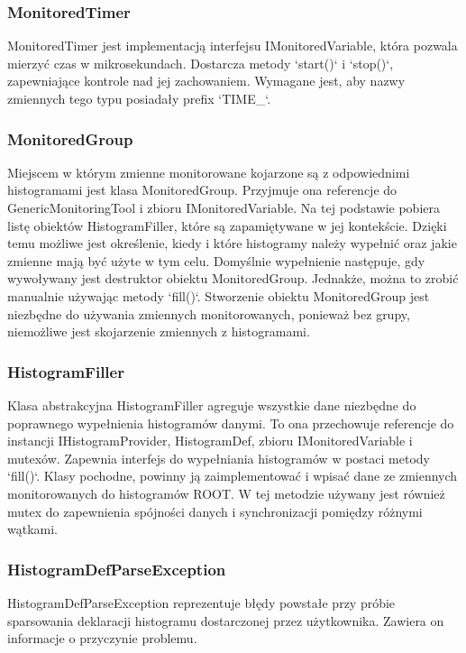 \subsubsection{MonitoredTimer}
MonitoredTimer jest implementacją interfejsu IMonitoredVariable, która pozwala mierzyć czas w mikrosekundach.
Dostarcza metody `start()` i `stop()`, zapewniające kontrole nad jej zachowaniem.
Wymagane jest, aby nazwy zmiennych tego typu posiadały prefix `TIME\_`.

\subsubsection{MonitoredGroup}
Miejscem w którym zmienne monitorowane kojarzone są z odpowiednimi histogramami jest klasa MonitoredGroup. 
Przyjmuje ona referencje do GenericMonitoringTool i zbioru IMonitoredVariable.
Na tej podstawie pobiera listę obiektów HistogramFiller, które są zapamiętywane w jej kontekście.
Dzięki temu możliwe jest określenie, kiedy i które histogramy należy wypełnić oraz jakie zmienne mają być użyte w tym celu.
Domyślnie wypełnienie następuje, gdy wywoływany jest destruktor obiektu MonitoredGroup. 
Jednakże, można to zrobić manualnie używając metody `fill()`.
Stworzenie obiektu MonitoredGroup jest niezbędne do używania zmiennych monitorowanych, ponieważ bez grupy, niemożliwe jest skojarzenie zmiennych z histogramami. 

\subsubsection{HistogramFiller}
Klasa abstrakcyjna HistogramFiller agreguje wszystkie dane niezbędne do poprawnego wypełnienia histogramów danymi. 
To ona przechowuje referencje do instancji IHistogramProvider, HistogramDef, zbioru IMonitoredVariable i mutexów.
Zapewnia interfejs do wypełniania histogramów w postaci metody `fill()`.
Klasy pochodne, powinny ją zaimplementować i wpisać dane ze zmiennych monitorowanych do histogramów ROOT.
W tej metodzie używany jest również mutex do zapewnienia spójności danych i synchronizacji pomiędzy różnymi wątkami. 

\subsubsection{HistogramDefParseException}
HistogramDefParseException reprezentuje błędy powstałe przy próbie sparsowania deklaracji histogramu dostarczonej przez użytkownika.
Zawiera on informacje o przyczynie problemu.

